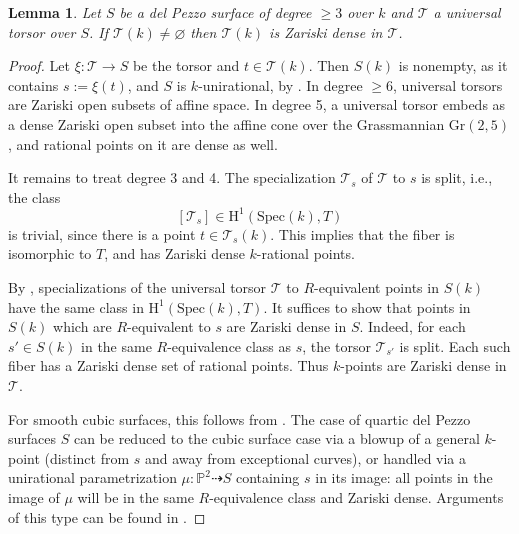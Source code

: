 \documentclass[12pt, reqno]{amsart}
\theoremstyle{plain}
\newtheorem{lemm}[prop]{Lemma}
\theoremstyle{remark}
\theoremstyle{definition}
\numberwithin{equation}{section}
\def\cT{{\mathcal T}}
\def\bP{{\mathbb P}}
\def\rH{{\mathrm H}}
\def\Pic{\mathrm{Pic}}
\def\Gr{\mathrm{Gr}}
\def\Spec{\mathrm{Spec}}
\begin{document}
\begin{lemm}\label{lemm:dense}
Let $S$ be a del Pezzo surface of degree $\ge 3$ over $k$ and $\cT$ a universal torsor over $S$. If $\cT(k)\neq \varnothing$ then $\cT(k)$ is Zariski dense in $\cT$.
\end{lemm}
\begin{proof}
Let $\xi:\cT\to S$ be the torsor and $t\in \cT(k)$.
Then $S(k)$ is nonempty, as it contains $s:=\xi(t)$, and $S$ is $k$-unirational, by
\cite[Theorems 29.4 and 30.1]{manin-book}. 
In degree $\ge 6$, universal torsors are Zariski open subsets of affine space. In degree 5, a universal torsor embeds as a dense Zariski open subset into the affine cone over the Grassmannian $\Gr(2,5)$, and rational points on it are dense as well. 

It remains to treat degree 3 and 4. The specialization $\cT_{s}$ of $\cT$ to $s$ is split, i.e., 
the class
$$
[\cT_{s}]\in \rH^1(\Spec(k), T)
$$
is trivial, since there is a point $t\in\cT_s(k)$. This implies that the fiber is isomorphic to $T$, and has Zariski dense $k$-rational points.  

By \cite[Proposition 2.7.2]{CTSansucDuke}, specializations of the universal torsor $\cT$ to $R$-equivalent points in $S(k)$ have the same class in $\rH^1(\Spec(k),T)$. It suffices to show that points in $S(k)$ which are $R$-equivalent to $s$ are Zariski dense in $S$. Indeed, for each $s'\in S(k)$ in the same $R$-equivalence class as $s$, the torsor $\cT_{s'}$ is split. Each such fiber has a Zariski dense set of rational points. Thus $k$-points are Zariski dense in $\cT$.  

For smooth cubic surfaces, this follows from 
\cite[Theorems 13.1 and 14.3]{manin-book}. 
The case of quartic del Pezzo surfaces $S$ can be reduced to the cubic surface case via a blowup of a general $k$-point (distinct from $s$ and away from exceptional curves), or
handled via a unirational parametrization $\mu: \bP^2\dashrightarrow S$ containing $s$ in its image: all points in the image of $\mu$ will be in the same $R$-equivalence class and Zariski dense. Arguments of this type can be found in \cite[Section 2.9]{CTSansucDuke}.
\end{proof}




\end{document}
